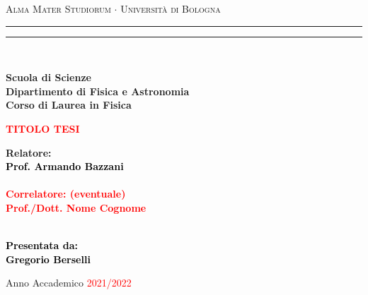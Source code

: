 \documentclass[12pt,a4paper]{report}
\begin{document}
\begin{titlepage}
%
%
%
%
\begin{center}
{{\Large{\textsc{Alma Mater Studiorum $\cdot$ Universit\`a di Bologna}}}} 
\rule[0.1cm]{15.8cm}{0.1mm}
\rule[0.5cm]{15.8cm}{0.6mm}
\\\vspace{3mm}

{\small{\bf Scuola di Scienze \\ 
Dipartimento di Fisica e Astronomia\\
Corso di Laurea in Fisica}}

\end{center}

\vspace{23mm}

\begin{center}\textcolor{red}{
%
%
{\LARGE{\bf TITOLO TESI}}\\
}\end{center}

\vspace{50mm} \par \noindent

\begin{minipage}[t]{0.47\textwidth}
%
%
{\large{\bf Relatore: \vspace{2mm}\\\textcolor{black}{
Prof. Armando Bazzani}\\\\
%
%
%
\textcolor{red}{
\bf Correlatore: (eventuale)
\vspace{2mm}\\
Prof./Dott. Nome Cognome\\\\}}}
\end{minipage}
%
\hfill
%
\begin{minipage}[t]{0.47\textwidth}\raggedleft \textcolor{black}{
{\large{\bf Presentata da:
\vspace{2mm}\\
Gregorio Berselli}}}
\end{minipage}

\vspace{40mm}

\begin{center}
%
%
Anno Accademico \textcolor{red}{2021/2022}
\end{center}

\end{titlepage}
\end{document}
